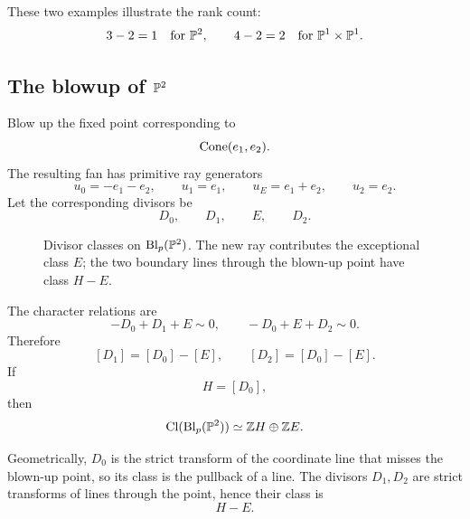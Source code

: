 These two examples illustrate the rank count:
\[
3-2=1
\quad\text{for }\PP^2,
\qquad
4-2=2
\quad\text{for }\PP^1\times\PP^1.
\]

\subsection{The blowup of \texorpdfstring{\(\PP^2\)}{P2}}

Blow up the fixed point corresponding to
\[
\Cone{e_1,e_2}.
\]
The resulting fan has primitive ray generators
\[
u_0=-e_1-e_2,
\qquad
u_1=e_1,
\qquad
u_E=e_1+e_2,
\qquad
u_2=e_2.
\]
Let the corresponding divisors be
\[
D_0,\qquad D_1,\qquad E,\qquad D_2.
\]

\begin{figure}[ht]
\centering
{}
\caption{Divisor classes on \(\Bl_p(\PP^2)\). The new ray contributes
the exceptional class \(E\); the two boundary lines through the
blown-up point have class \(H-E\).}
\label{fig:blowup-p2-divisor-classes}
\end{figure}

The character relations are
\[
-D_0+D_1+E\sim0,
\qquad
-D_0+E+D_2\sim0.
\]
Therefore
\[
[D_1]=[D_0]-[E],
\qquad
[D_2]=[D_0]-[E].
\]
If
\[
H=[D_0],
\]
then
\[
\Cl(\Blp{\PP^2}{p})
\simeq
\ZZ H\oplus\ZZ E.
\]

Geometrically, \(D_0\) is the strict transform of the coordinate line
that misses the blown-up point, so its class is the pullback of a line.
The divisors \(D_1,D_2\) are strict transforms of lines through the
point, hence their class is
\[
H-E.
\]

